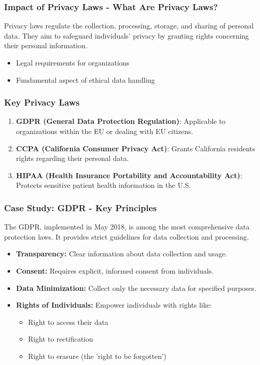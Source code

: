 \documentclass[aspectratio=169]{beamer}
\begin{document}
\begin{frame}[fragile]
    \frametitle{Impact of Privacy Laws - What Are Privacy Laws?}
    Privacy laws regulate the collection, processing, storage, and sharing of personal data. They aim to safeguard individuals' privacy by granting rights concerning their personal information.
    \begin{itemize}
        \item Legal requirements for organizations
        \item Fundamental aspect of ethical data handling
    \end{itemize}
\end{frame}

\begin{frame}[fragile]
    \frametitle{Key Privacy Laws}
    \begin{enumerate}
        \item \textbf{GDPR (General Data Protection Regulation)}: Applicable to organizations within the EU or dealing with EU citizens.
        \item \textbf{CCPA (California Consumer Privacy Act)}: Grants California residents rights regarding their personal data.
        \item \textbf{HIPAA (Health Insurance Portability and Accountability Act)}: Protects sensitive patient health information in the U.S.
    \end{enumerate}
\end{frame}

\begin{frame}[fragile]
    \frametitle{Case Study: GDPR - Key Principles}
    The GDPR, implemented in May 2018, is among the most comprehensive data protection laws. It provides strict guidelines for data collection and processing.
    \begin{itemize}
        \item \textbf{Transparency:} Clear information about data collection and usage.
        \item \textbf{Consent:} Requires explicit, informed consent from individuals.
        \item \textbf{Data Minimization:} Collect only the necessary data for specified purposes.
        \item \textbf{Rights of Individuals:} Empower individuals with rights like:
        \begin{itemize}
            \item Right to access their data
            \item Right to rectification
            \item Right to erasure (the 'right to be forgotten')
        \end{itemize}
    \end{itemize}
\end{frame}
\end{document}
